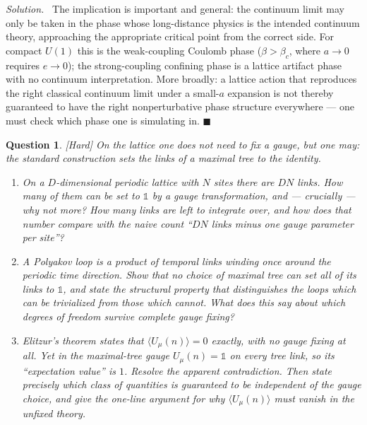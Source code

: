 \documentclass[11pt]{article}
\newcommand{\diff}[1]{\textcolor{blue!60!black}{\footnotesize\textsf{[#1]}}\quad}
\newtheorem{question}{Question}
\newenvironment{solution}{\par\smallskip\noindent\textit{Solution.}\ }{\hfill$\blacksquare$\par\smallskip}
\begin{document}
\begin{solution}
The implication is important and general: the continuum limit may only be taken in the phase whose long-distance physics is the intended continuum theory, approaching the appropriate critical point from the correct side. For compact $U(1)$ this is the weak-coupling Coulomb phase ($\beta > \beta_c$, where $a\to0$ requires $e\to0$); the strong-coupling confining phase is a lattice artifact phase with no continuum interpretation. More broadly: a lattice action that reproduces the right classical continuum limit under a small-$a$ expansion is not thereby guaranteed to have the right nonperturbative phase structure everywhere --- one must check which phase one is simulating in.
\end{solution}

\begin{question}
\diff{Hard} On the lattice one does not need to fix a gauge, but one may: the standard construction sets the links of a \emph{maximal tree} to the identity.
\begin{enumerate}[label=(\roman*), leftmargin=*]
  \item On a $D$-dimensional periodic lattice with $N$ sites there are $DN$ links. How many of them can be set to $\mathbb{1}$ by a gauge transformation, and --- crucially --- why not more? How many links are left to integrate over, and how does that number compare with the naive count ``$DN$ links minus one gauge parameter per site''?
  \item A Polyakov loop is a product of temporal links winding once around the periodic time direction. Show that no choice of maximal tree can set \emph{all} of its links to $\mathbb{1}$, and state the structural property that distinguishes the loops which can be trivialized from those which cannot. What does this say about which degrees of freedom survive complete gauge fixing?
  \item Elitzur's theorem states that $\langle U_\mu(n)\rangle = 0$ exactly, with no gauge fixing at all. Yet in the maximal-tree gauge $U_\mu(n)=\mathbb{1}$ on every tree link, so its ``expectation value'' is $1$. Resolve the apparent contradiction. Then state precisely which class of quantities is guaranteed to be independent of the gauge choice, and give the one-line argument for why $\langle U_\mu(n)\rangle$ must vanish in the unfixed theory.
\end{enumerate}
\end{question}
\end{document}
